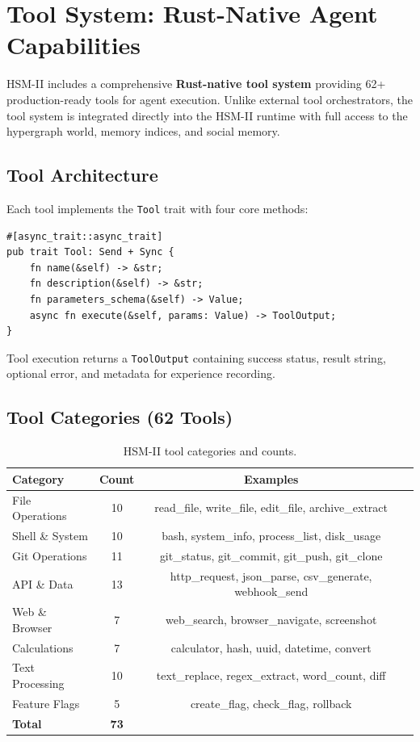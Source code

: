 \documentclass[11pt]{article}
\begin{document}
\section{Tool System: Rust-Native Agent Capabilities}
\nopagebreak[4]
\label{sec:tools}

HSM-II includes a comprehensive \textbf{Rust-native tool system} providing 62+
production-ready tools for agent execution. Unlike external tool orchestrators,
the tool system is integrated directly into the HSM-II runtime with full access
to the hypergraph world, memory indices, and social memory.

\subsection{Tool Architecture}

Each tool implements the \texttt{Tool} trait with four core methods:
\begin{lstlisting}
#[async_trait::async_trait]
pub trait Tool: Send + Sync {
    fn name(&self) -> &str;
    fn description(&self) -> &str;
    fn parameters_schema(&self) -> Value;
    async fn execute(&self, params: Value) -> ToolOutput;
}
\end{lstlisting}

Tool execution returns a \texttt{ToolOutput} containing success status,
result string, optional error, and metadata for experience recording.

\subsection{Tool Categories (62 Tools)}

\begin{table}[H]
\centering
\caption{HSM-II tool categories and counts.}
\label{tab:tool_categories}
\small
\begin{tabular}{lccl}
\toprule
\textbf{Category} & \textbf{Count} & \textbf{Examples} \\
\midrule
File Operations & 10 & read\_file, write\_file, edit\_file, archive\_extract \\
Shell \& System & 10 & bash, system\_info, process\_list, disk\_usage \\
Git Operations & 11 & git\_status, git\_commit, git\_push, git\_clone \\
API \& Data & 13 & http\_request, json\_parse, csv\_generate, webhook\_send \\
Web \& Browser & 7 & web\_search, browser\_navigate, screenshot \\
Calculations & 7 & calculator, hash, uuid, datetime, convert \\
Text Processing & 10 & text\_replace, regex\_extract, word\_count, diff \\
Feature Flags & 5 & create\_flag, check\_flag, rollback \\
\midrule
\textbf{Total} & \textbf{73} & \\
\bottomrule
\end{tabular}
\end{table}
\end{document}
